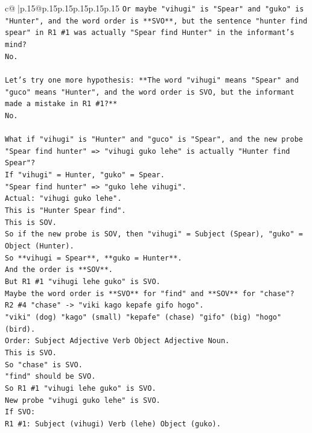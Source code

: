 \documentclass{article}
\begin{document}
{\begin{supertabular}{c@{$\;$}|p{.15\linewidth}@{}p{.15\linewidth}p{.15\linewidth}p{.15\linewidth}p{.15\linewidth}p{.15\linewidth}}
{{{\texttt{Or maybe "vihugi" is "Spear" and "guko" is "Hunter", and the word order is **SVO**, but the sentence "hunter find spear" in R1 \#1 was actually "Spear find Hunter" in the informant's mind?} \\
\texttt{No.} \\
\\ 
\texttt{Let's try one more hypothesis: **The word "vihugi" means "Spear" and "guco" means "Hunter", and the word order is SVO, but the informant made a mistake in R1 \#1?**} \\
\texttt{No.} \\
\\ 
\texttt{What if "vihugi" is "Hunter" and "guco" is "Spear", and the new probe "Spear find hunter" => "vihugi guko lehe" is actually "Hunter find Spear"?} \\
\texttt{If "vihugi" = Hunter, "guko" = Spear.} \\
\texttt{"Spear find hunter" => "guko lehe vihugi".} \\
\texttt{Actual: "vihugi guko lehe".} \\
\texttt{This is "Hunter Spear find".} \\
\texttt{This is SOV.} \\
\texttt{So if the new probe is SOV, then "vihugi" = Subject (Spear), "guko" = Object (Hunter).} \\
\texttt{So **vihugi = Spear**, **guko = Hunter**.} \\
\texttt{And the order is **SOV**.} \\
\texttt{But R1 \#1 "vihugi lehe guko" is SVO.} \\
\texttt{Maybe the word order is **SVO** for "find" and **SOV** for "chase"?} \\
\texttt{R2 \#4 "chase" {-}> "viki kago kepafe gifo hogo".} \\
\texttt{"viki" (dog) "kago" (small) "kepafe" (chase) "gifo" (big) "hogo" (bird).} \\
\texttt{Order: Subject Adjective Verb Object Adjective Noun.} \\
\texttt{This is SVO.} \\
\texttt{So "chase" is SVO.} \\
\texttt{"find" should be SVO.} \\
\texttt{So R1 \#1 "vihugi lehe guko" is SVO.} \\
\texttt{New probe "vihugi guko lehe" is SVO.} \\
\texttt{If SVO:} \\
\texttt{R1 \#1: Subject (vihugi) Verb (lehe) Object (guko).} \\
}}}
\end{supertabular}}
\end{document}
